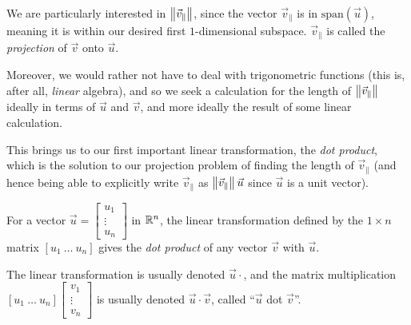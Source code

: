 \documentclass{ximera}
\begin{document}
     \begin{center}
    \end{center}
     
     We are particularly interested in $\left\|\vec{v}_\parallel\right\|$, since the vector $\vec{v}_\parallel$ is in $\mbox{span}(\vec{u})$, meaning it is within our desired first $1$-dimensional subspace. $\vec{v}_\parallel$ is called the \emph{projection} of $\vec{v}$ onto $\vec{u}$. 

     Moreover, we would rather not have to deal with trigonometric functions (this is, after all, \emph{linear} algebra), and so we seek a calculation for the length of $\left\|\vec{v}_\parallel\right\|$ ideally in terms of $\vec{u}$ and $\vec{v}$, and more ideally the result of some linear calculation.
     
     This brings us to our first important linear transformation, the \emph{dot product}, which is the solution to our projection problem of finding the length of $\vec{v}_\parallel$ (and hence being able to explicitly write $\vec{v}_\parallel$ as $\left\|\vec{v}_\parallel\right\|\vec{u}$ since $\vec{u}$ is a unit vector).

     \begin{definition}
      For a vector $\vec{u}=\begin{bmatrix}
         u_1\\\vdots \\ u_n
      \end{bmatrix}$ in $\mathbb{R}^n$, the linear transformation defined by the $1\times n$ matrix $[u_1\ \ldots\ u_n]$ gives the \emph{dot product} of any vector $\vec{v}$ with $\vec{u}$. 
      
      The linear transformation is usually denoted $\vec{u}\cdot$, and the matrix multiplication $[u_1\ \ldots\ u_n]\begin{bmatrix}
      v_1 \\ \vdots \\v_n
      \end{bmatrix}$ is usually denoted $\vec{u}\cdot \vec{v}$, called ``$\vec{u}$ dot $\vec{v}$''.
     \end{definition}
\end{document}
